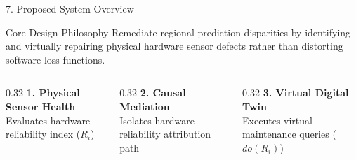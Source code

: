 \documentclass[aspectratio=169, 10pt]{beamer}
\begin{document}
\begin{frame}{7. Proposed System Overview}
  \begin{block}{Core Design Philosophy}
    Remediate regional prediction disparities by identifying and virtually repairing physical hardware sensor defects rather than distorting software loss functions.
  \end{block}
  
  \vspace{0.4cm}
  
  \begin{columns}
    \begin{column}{0.32\textwidth}
      \centering
      \textbf{1. Physical Sensor Health}\\
      Evaluates hardware reliability index ($R_i$)
    \end{column}
    \begin{column}{0.32\textwidth}
      \centering
      \textbf{2. Causal Mediation}\\
      Isolates hardware reliability attribution path
    \end{column}
    \begin{column}{0.32\textwidth}
      \centering
      \textbf{3. Virtual Digital Twin}\\
      Executes virtual maintenance queries ($do(R_i)$)
    \end{column}
  \end{columns}
\end{frame}
\end{document}
